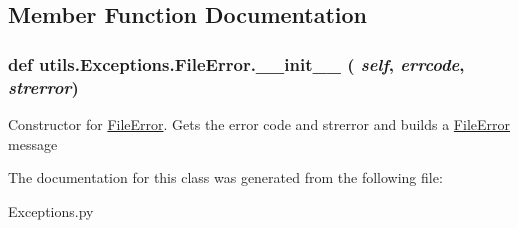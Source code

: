 \subsection{Member Function Documentation}
\hypertarget{classutils_1_1Exceptions_1_1FileError_a8890e1c4392ed23344ccaa85f8d92340}{
\subsubsection[{\_\-\_\-init\_\-\_\-}]{\setlength{\rightskip}{0pt plus 5cm}def utils.Exceptions.FileError.\_\-\_\-init\_\-\_\- ( {\em self}, \/   {\em errcode}, \/   {\em strerror})}}
\label{classutils_1_1Exceptions_1_1FileError_a8890e1c4392ed23344ccaa85f8d92340}


Constructor for \hyperlink{classutils_1_1Exceptions_1_1FileError}{FileError}. Gets the error code and strerror and builds a \hyperlink{classutils_1_1Exceptions_1_1FileError}{FileError} message 

The documentation for this class was generated from the following file:\begin{DoxyCompactItemize}
\item 
Exceptions.py\end{DoxyCompactItemize}

